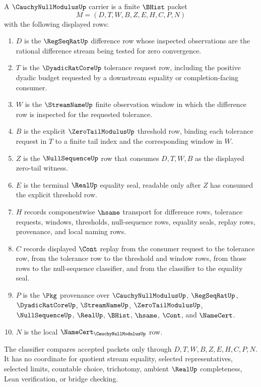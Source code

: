 \begin{definition}
\label{def:cauchy-null-modulus-carrier}
A $\CauchyNullModulusUp$ carrier is a finite $\BHist$ packet
$$
M=(D,T,W,B,Z,E,H,C,P,N)
$$
with the following displayed rows:
\begin{enumerate}
\item $D$ is the $\RegSeqRatUp$ difference row whose inspected observations are the rational difference stream being tested for zero convergence.
\item $T$ is the $\DyadicRatCoreUp$ tolerance request row, including the positive dyadic budget requested by a downstream equality or completion-facing consumer.
\item $W$ is the $\StreamNameUp$ finite observation window in which the difference row is inspected for the requested tolerance.
\item $B$ is the explicit $\ZeroTailModulusUp$ threshold row, binding each tolerance request in $T$ to a finite tail index and the corresponding window in $W$.
\item $Z$ is the $\NullSequenceUp$ row that consumes $D,T,W,B$ as the displayed zero-tail witness.
\item $E$ is the terminal $\RealUp$ equality seal, readable only after $Z$ has consumed the explicit threshold row.
\item $H$ records componentwise $\hsame$ transport for difference rows, tolerance requests, windows, thresholds, null-sequence rows, equality seals, replay rows, provenance, and local naming rows.
\item $C$ records displayed $\Cont$ replay from the consumer request to the tolerance row, from the tolerance row to the threshold and window rows, from those rows to the null-sequence classifier, and from the classifier to the equality seal.
\item $P$ is the $\Pkg$ provenance over $\CauchyNullModulusUp$, $\RegSeqRatUp$, $\DyadicRatCoreUp$, $\StreamNameUp$, $\ZeroTailModulusUp$, $\NullSequenceUp$, $\RealUp$, $\BHist$, $\hsame$, $\Cont$, and $\NameCert$.
\item $N$ is the local $\NameCert_{\CauchyNullModulusUp}$ row.
\end{enumerate}
The classifier compares accepted packets only through $D,T,W,B,Z,E,H,C,P,N$. It has no coordinate for quotient stream equality, selected representatives, selected limits, countable choice, trichotomy, ambient $\RealUp$ completeness, Lean verification, or bridge checking.
\end{definition}

